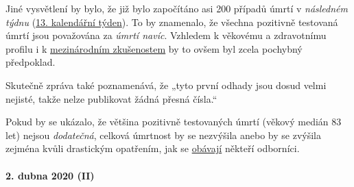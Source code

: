 Jiné vysvětlení by bylo, že již bylo započítáno asi 200 případů úmrtí v
\emph{následném týdnu}
(\href{https://de.wikipedia.org/wiki/COVID-19-Pandemie_in_der_Schweiz\#Todesf\%C3\%A4lle}{13.
kalendářní týden}). To by znamenalo, že všechna pozitivně testovaná
úmrtí jsou považována za \emph{úmrtí navíc}. Vzhledem k věkovému a
zdravotnímu profilu i k
\href{https://swprs.org/rki-relativiert-corona-todesfaelle/}{mezinárodním
zkušenostem} by to ovšem byl zcela pochybný předpoklad.

Skutečně zpráva také poznamenává, že „tyto první odhady jsou dosud velmi
nejisté, takže nelze publikovat žádná přesná čísla.``

Pokud by se ukázalo, že většina pozitivně testovaných úmrtí (věkový
medián 83 let) nejsou \emph{dodatečná}, celková úmrtnost by se nezvýšila
anebo by se zvýšila zejména kvůli drastickým opatřením, jak se
\href{https://swprs.org/offener-brief-von-professor-sucharit-bhakdi-an-bundeskanzlerin-dr-angela-merkel/}{obávají}
někteří odborníci.

\hypertarget{2-dubna-2020-ii}{%
\paragraph{2. dubna 2020 (II)}\label{2-dubna-2020-ii}}

